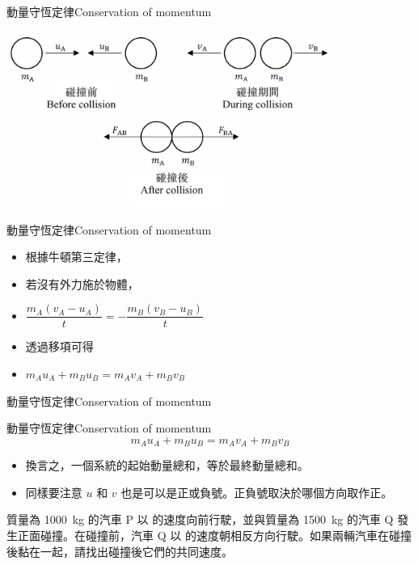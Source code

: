 \documentclass[beamer=true]{standalone}
\begin{document}
\begin{frame}{動量守恆定律Conservation of momentum}
    \par{\par\centering
        \includegraphics[width=0.8\textwidth]{assets/02c41700.png}
        \par}
\end{frame}
\begin{frame}{動量守恆定律Conservation of momentum}
    \begin{itemize}
        \item 根據牛頓第三定律，
        \item 若沒有外力施於物體，
        \item []$\dfrac{m_A(v_A-u_A)}{t}=-\dfrac{m_B(v_B-u_B)}{t}$
        \item 透過移項可得
        \item []$m_Au_A+m_Bu_B=m_Av_A+m_Bv_B$
    \end{itemize}
\end{frame}
\begin{frame}{動量守恆定律Conservation of momentum}

    \begin{alertblock}
        {動量守恆定律Conservation of momentum}
        \begin{equation}
            m_Au_A+m_Bu_B=m_Av_A+m_Bv_B
        \end{equation}
    \end{alertblock}
    \begin{itemize}
        \item 換言之，一個系統的起始動量總和，等於最終動量總和。
        \item 同樣要注意 $u$ 和 $v$ 也是可以是正或負號。正負號取決於哪個方向取作正。
    \end{itemize}
\end{frame}

\begin{eg}
    質量為 \qty{1000}{kg} 的汽車 P 以  的速度向前行駛，並與質量為 \qty{1500}{kg} 的汽車 Q 發生正面碰撞。在碰撞前，汽車 Q 以  的速度朝相反方向行駛。如果兩輛汽車在碰撞後黏在一起，請找出碰撞後它們的共同速度。
\end{eg}
\end{document}
